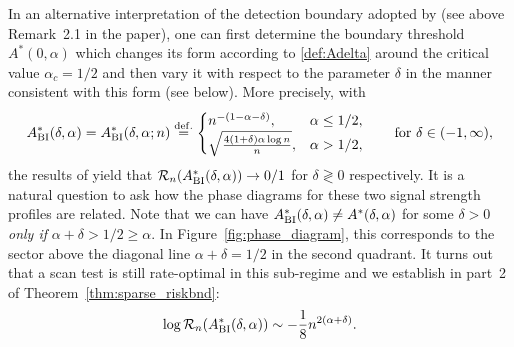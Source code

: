 \documentclass[11pt,reqno,letterpaper]{amsart}
\numberwithin{equation}{section}
\theoremstyle{plain}
\begin{document}
\vspace{0.1cm}

In an alternative interpretation of the detection boundary adopted by 
\cite{butuceasubmatrix2013} (see above Remark~2.1 in the paper), one can first determine the boundary threshold $A^\ast(0, \alpha)$ which changes its form according to \eqref{def:Adelta} around the critical value $\alpha_c = 1/2$ and then vary it with 
respect to the parameter $\delta$ in the manner consistent with this form (see 
below). More precisely, with
\begin{equation}\label{def:AdeltaBI}
A^\ast_{{\rm BI}}(\delta, \alpha) = A^\ast_{{\rm BI}}(\delta, \alpha; n) \stackrel{{\rm def.}}{=} 
    \begin{cases}
        n^{-(1 - \alpha - \delta)}, & \alpha \le 1/2,\\
        \sqrt{\frac{4(1+\delta)\alpha\log n}{n}}, & \alpha > 1/2,
    \end{cases} \qquad \mbox{for } \delta\in(-1,\infty),
\end{equation}
the results of \cite{butuceasubmatrix2013} yield that $\mathcal R_n(A^\ast_{{\rm BI}}(\delta, \alpha)) \to 0/1$ for $\delta \gtrless 0$ respectively. It is a natural question to ask how the 
phase diagrams for these two signal strength profiles are related. Note that we can have 
$A^\ast_{{\rm BI}}(\delta, \alpha) \neq A^\ast(\delta, \alpha)$ for some $\delta > 0$ {\em only if} $\alpha + \delta > 1/2 \ge \alpha$. In Figure~\ref{fig:phase_diagram}, this corresponds to the sector above the diagonal line $\alpha + \delta = 1/2$ in the second quadrant. It turns out 
that a scan test is still rate-optimal in this sub-regime and we establish in part~2 of 
Theorem~\ref{thm:sparse_riskbnd}:
\begin{equation}\label{eq:densesupBIheu}
\log\mathcal R_n(A^\ast_{{\rm BI}}(\delta, \alpha))\sim -\frac18 n^{2(\alpha+\delta)}.
\end{equation}
 

\smallskip
\end{document}

